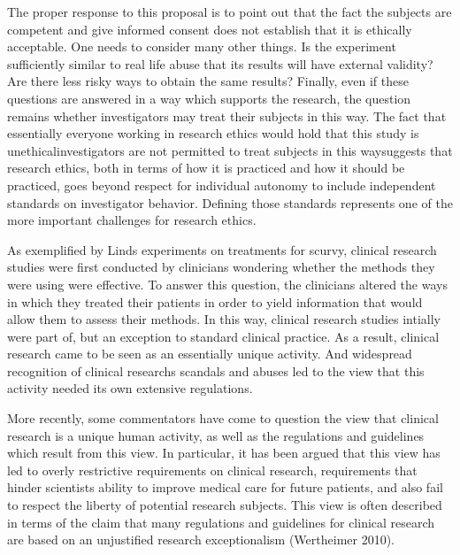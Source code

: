 \documentclass[12p]{article}
\begin{document}
The proper response to this proposal is to point out that the fact the subjects are competent and give informed consent does not establish that it is ethically acceptable. One needs to consider many other things. Is the experiment sufficiently similar to real life abuse that its results will have external validity? Are there less risky ways to obtain the same results? Finally, even if these questions are answered in a way which supports the research, the question remains whether investigators may treat their subjects in this way. The fact that essentially everyone working in research ethics would hold that this study is unethicalinvestigators are not permitted to treat subjects in this waysuggests that research ethics, both in terms of how it is practiced and how it should be practiced, goes beyond respect for individual autonomy to include independent standards on investigator behavior. Defining those standards represents one of the more important challenges for research ethics.

As exemplified by Linds experiments on treatments for scurvy, clinical research studies were first conducted by clinicians wondering whether the methods they were using were effective. To answer this question, the clinicians altered the ways in which they treated their patients in order to yield information that would allow them to assess their methods. In this way, clinical research studies intially were part of, but an exception to standard clinical practice. As a result, clinical research came to be seen as an essentially unique activity. And widespread recognition of clinical researchs scandals and abuses led to the view that this activity needed its own extensive regulations.

More recently, some commentators have come to question the view that clinical research is a unique human activity, as well as the regulations and guidelines which result from this view. In particular, it has been argued that this view has led to overly restrictive requirements on clinical research, requirements that hinder scientists ability to improve medical care for future patients, and also fail to respect the liberty of potential research subjects. This view is often described in terms of the claim that many regulations and guidelines for clinical research are based on an unjustified research exceptionalism (Wertheimer 2010).
\end{document}
